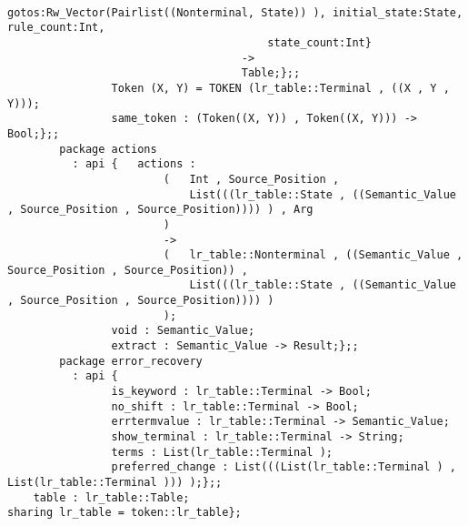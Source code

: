 \begin{verbatim}
                                        gotos:Rw_Vector(Pairlist((Nonterminal, State)) ), initial_state:State, rule_count:Int,
                                        state_count:Int}
                                    ->
                                    Table;};;
                Token (X, Y) = TOKEN (lr_table::Terminal , ((X , Y , Y)));
                same_token : (Token((X, Y)) , Token((X, Y))) -> Bool;};;
        package actions
          : api {   actions :
                        (   Int , Source_Position ,
                            List(((lr_table::State , ((Semantic_Value , Source_Position , Source_Position)))) ) , Arg
                        )
                        ->
                        (   lr_table::Nonterminal , ((Semantic_Value , Source_Position , Source_Position)) ,
                            List(((lr_table::State , ((Semantic_Value , Source_Position , Source_Position)))) )
                        );
                void : Semantic_Value;
                extract : Semantic_Value -> Result;};;
        package error_recovery
          : api {
                is_keyword : lr_table::Terminal -> Bool;
                no_shift : lr_table::Terminal -> Bool;
                errtermvalue : lr_table::Terminal -> Semantic_Value;
                show_terminal : lr_table::Terminal -> String;
                terms : List(lr_table::Terminal );
                preferred_change : List(((List(lr_table::Terminal ) , List(lr_table::Terminal ))) );};;
    table : lr_table::Table;
sharing lr_table = token::lr_table};
\end{verbatim}
